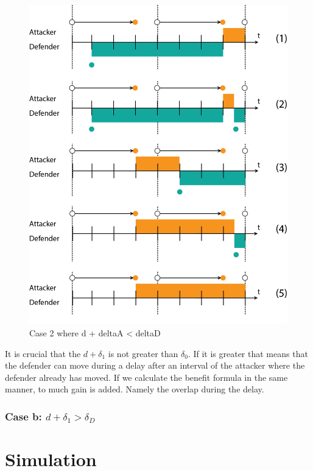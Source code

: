 \begin{figure}[hbtp]
\caption{Case 2 where d + deltaA < deltaD}
\centering
\includegraphics[scale=0.7]{Images/FlipItCase2.png}
\end{figure}


It is crucial that the $d + \delta_{1}$ is not greater than $ \delta_{0}$. If it is greater that means that the defender can move during a delay after an interval of the attacker where the defender already has moved. If we calculate the benefit formula in the same manner, to much gain is added. Namely the overlap during the delay.

\subsubsection*{\textbf{Case b:} $d + \delta_{1} > \delta_{D}$}


\section{Simulation}


%
